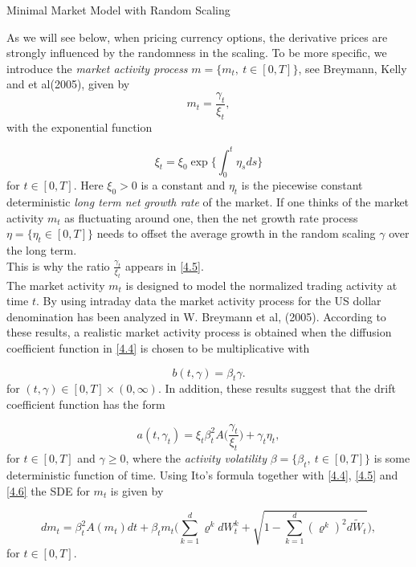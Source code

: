 \documentclass[unknownkeysallowed, compress]{beamer}
\theoremstyle{plain}
\begin{document}
\begin{frame}[allowframebreaks]{Minimal Market Model with Random Scaling}
\par As we will see below, when pricing currency options, the derivative prices are strongly influenced by the randomness in the scaling. To be more specific, we introduce the \emph{market activity process } $m = \{m_t,~t\in[0,T]\}$, see Breymann, Kelly and et al(2005), given by 
\begin{equation}\label{4.5}
m_t = \frac{\gamma_t}{\xi_t},
\end{equation}
with the exponential function

\begin{equation}\label{4.6}
\xi_t = \xi_0\exp\bigg\{\int_0^t\eta_sds\}
\end{equation}
for $t\in [0,T]$. Here $\xi_0>0$ is a constant and $\eta_t$ is the piecewise constant deterministic \emph{long term net growth rate} of the market. If one thinks of the market activity $m_t$ as fluctuating around one, then the net growth rate process $\eta = \{\eta_t\in[0,T]\}$ needs to offset the average growth in the random scaling $\gamma$ over the long term.\\
This is why the ratio $\frac{\gamma_t}{\xi_t}$ appears in \eqref{4.5}.\\

The market activity $m_t$ is designed to model the normalized trading activity at
time $t$. By using intraday data the market activity process for the US dollar
denomination has been analyzed in W. Breymann et al, (2005). According to
these results, a realistic market activity process is obtained when the diffusion
coefficient function in \eqref{4.4} is chosen to be multiplicative with

\begin{equation}\label{4.7}
b(t,\gamma) = \beta_t\gamma.
\end{equation}
for $(t,\gamma)\in[0,T]\times (0,\infty)$. In addition, these results suggest that the drift coefficient function has the form 

\begin{equation}\label{4.8}
a(t,\gamma_t) = \xi_t\beta_t^2A\bigg(\frac{\gamma_t}{\xi_t}\bigg)+\gamma_t\eta_t,
\end{equation}
for $t\in[0,T]$ and $\gamma\geq 0$, where the \emph{activity volatility} $\beta = \{\beta_t, ~t\in[0,T]\}$ is some deterministic function of time. Using Ito's formula together with \eqref{4.4}, \eqref{4.5} and \eqref{4.6} the  SDE for $m_t$ is given by

$$
dm_t = \beta_t^2 A(m_t)dt+\beta_tm_t\bigg(\sum_{k = 1}^d\varrho^kdW_t^k+\sqrt{1-\sum_{k = 1}^d(\varrho^k)^2d\tilde{W}_t}\bigg),
$$
for $t\in[0,T]$.\\


\end{frame}
\end{document}
